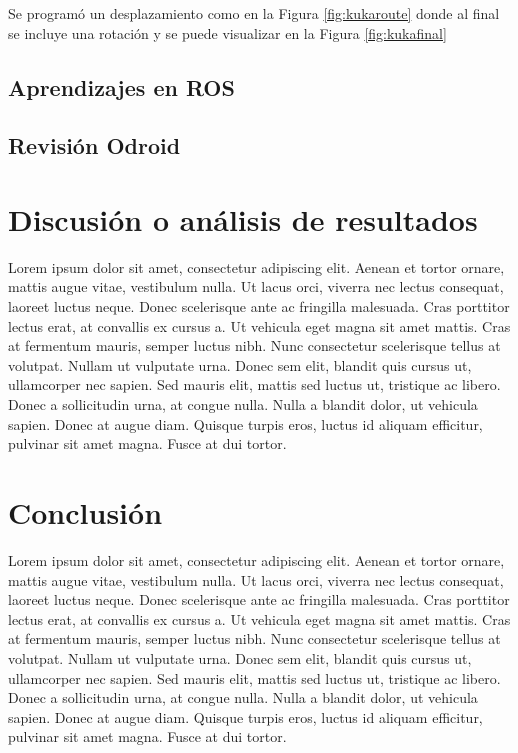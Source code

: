 \documentclass[conference]{IEEEtran}
\begin{document}
  Se programó un desplazamiento como en la Figura \ref{fig:kukaroute} donde al final
  se incluye una rotación y se puede visualizar en la Figura \ref{fig:kukafinal}

  \subsection{Aprendizajes en ROS}
  \subsection{Revisión Odroid}
  \section{Discusión o análisis de resultados}
  Lorem ipsum dolor sit amet, consectetur adipiscing elit. Aenean et tortor ornare, mattis augue vitae, vestibulum nulla. Ut lacus orci, viverra nec lectus consequat, laoreet luctus neque. Donec scelerisque ante ac fringilla malesuada. Cras porttitor lectus erat, at convallis ex cursus a. Ut vehicula eget magna sit amet mattis. Cras at fermentum mauris, semper luctus nibh. Nunc consectetur scelerisque tellus at volutpat. Nullam ut vulputate urna. Donec sem elit, blandit quis cursus ut, ullamcorper nec sapien. Sed mauris elit, mattis sed luctus ut, tristique ac libero. Donec a sollicitudin urna, at congue nulla. Nulla a blandit dolor, ut vehicula sapien. Donec at augue diam. Quisque turpis eros, luctus id aliquam efficitur, pulvinar sit amet magna. Fusce at dui tortor.
  
  \section{Conclusión}
  Lorem ipsum dolor sit amet, consectetur adipiscing elit. Aenean et tortor ornare, mattis augue vitae, vestibulum nulla. Ut lacus orci, viverra nec lectus consequat, laoreet luctus neque. Donec scelerisque ante ac fringilla malesuada. Cras porttitor lectus erat, at convallis ex cursus a. Ut vehicula eget magna sit amet mattis. Cras at fermentum mauris, semper luctus nibh. Nunc consectetur scelerisque tellus at volutpat. Nullam ut vulputate urna. Donec sem elit, blandit quis cursus ut, ullamcorper nec sapien. Sed mauris elit, mattis sed luctus ut, tristique ac libero. Donec a sollicitudin urna, at congue nulla. Nulla a blandit dolor, ut vehicula sapien. Donec at augue diam. Quisque turpis eros, luctus id aliquam efficitur, pulvinar sit amet magna. Fusce at dui tortor.
  
\end{document}

